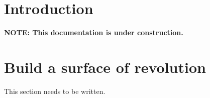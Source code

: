 \documentclass[11pt]{article}
\begin{document}
\clearpage
\tableofcontents

\vspace{3\baselineskip}

\section{Introduction}

{\bf NOTE: This documentation is under construction.}













\clearpage


\section{Build a surface of revolution}

This section needs to be written.

\clearpage



\clearpage

\end{document}
